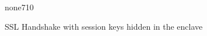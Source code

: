 \documentclass[../main.tex]{subfiles}
\begin{document}
\begin{figure}[H]
{\begin{Lsc}{none}{7}{10}
				\end{Lsc}
			}
			\caption{SSL Handshake with session keys hidden in the enclave}
			\label{fig:sess-keys-hidden}
		\end{figure}
\end{document}
